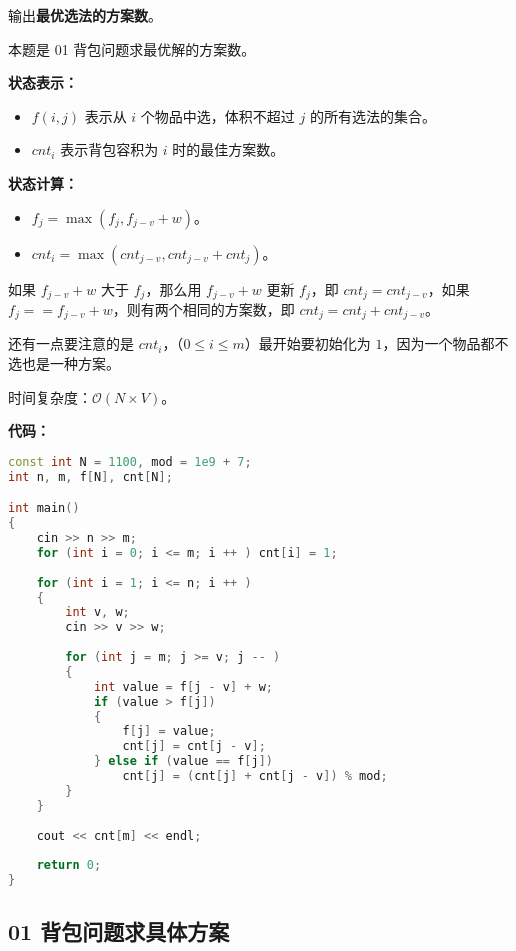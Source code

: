 输出\textbf{最优选法的方案数}。

本题是 01 背包问题求最优解的方案数。

\textbf{状态表示：}

\begin{itemize}
\item $f(i, j)$ 表示从 $i$ 个物品中选，体积不超过 $j$ 的所有选法的集合。
\item $cnt_i$ 表示背包容积为 $i$ 时的最佳方案数。
\end{itemize}

\textbf{状态计算：}

\begin{itemize}
\item $f_j = \max(f_j, f_{j - v} + w)$。
\item $cnt_i = \max(cnt_{j - v}, cnt_{j - v} + cnt_j)$。
\end{itemize}

如果 $f_{j - v} + w$ 大于 $f_j$，那么用 $f_{j - v} + w$ 更新 $f_j$，即 $cnt_j = cnt_{j - v}$，如果 $f_j == f_{j - v} + w$，则有两个相同的方案数，即 $cnt_j = cnt_j + cnt_{j - v}$。

还有一点要注意的是 $cnt_i$，（$0 \leq i \leq m$）最开始要初始化为 $1$，因为一个物品都不选也是一种方案。

时间复杂度：$\mathcal{O}(N \times V)$。

\textbf{代码：}

\begin{lstlisting}[language=cpp]
const int N = 1100, mod = 1e9 + 7;
int n, m, f[N], cnt[N];

int main()
{
    cin >> n >> m;
    for (int i = 0; i <= m; i ++ ) cnt[i] = 1;
    
    for (int i = 1; i <= n; i ++ )
    {
        int v, w;
        cin >> v >> w;
        
        for (int j = m; j >= v; j -- )
        {
            int value = f[j - v] + w;
            if (value > f[j])
            {
                f[j] = value;
                cnt[j] = cnt[j - v];
            } else if (value == f[j]) 
                cnt[j] = (cnt[j] + cnt[j - v]) % mod;
        }
    }
    
    cout << cnt[m] << endl;
    
    return 0;
}
\end{lstlisting}

\subsection{01 背包问题求具体方案}

